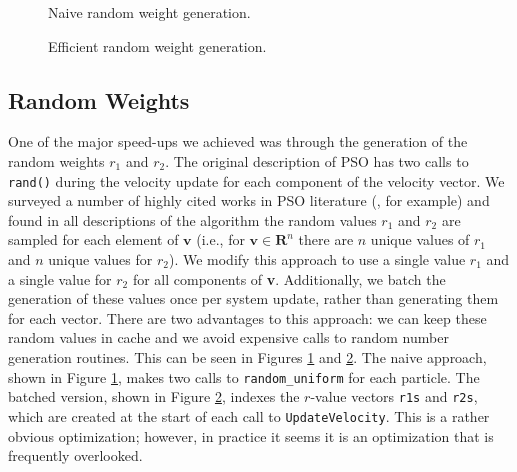 \begin{figure}
  
  \caption{Naive random weight generation.}\label{fig:naive-par}
\end{figure}

\begin{figure}
  
  \caption{Efficient random weight generation.}\label{fig:efficient-par}
\end{figure}

\subsection{Random Weights}
One of the major speed-ups we achieved was through
the generation of the random weights $r_1$ and $r_2$. The original description of
PSO \cite{pso} has two calls to \texttt{rand()} during the velocity update for each
component of the velocity vector. We surveyed a number of highly cited works in
PSO literature (\cite{pso-development, pso-overview}, for example) and found in
all descriptions of the algorithm the random values $r_1$ and $r_2$ are sampled
for each element of $\textbf{v}$ (i.e., for $\textbf{v}\in\mathbf{R}^n$ there
are $n$ unique values of $r_1$ and $n$ unique values for $r_2$). We modify this
approach to use a single value $r_1$ and a single value for $r_2$ for all
components of \textbf{v}. Additionally, we batch
the generation of these values once per system update, rather than generating
them for each vector.
There are two advantages to this approach: we can keep
these random values in cache and we avoid expensive calls to random number
generation routines. This can be seen in Figures \ref{fig:naive-par} and
\ref{fig:efficient-par}. The naive approach, shown in Figure \ref{fig:naive-par},
makes two calls to
\texttt{random\_uniform} for each particle. The batched version, shown in Figure
\ref{fig:efficient-par},
indexes the $r$-value vectors \texttt{r1s} and \texttt{r2s}, which are
created at the start of each call to \texttt{UpdateVelocity}. This is a rather
obvious optimization; however, in
practice it seems it is an optimization that is frequently overlooked.

